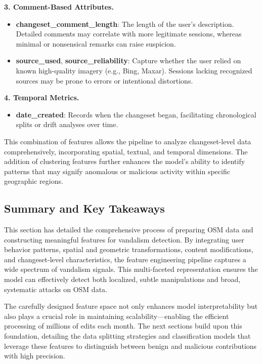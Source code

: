 \documentclass[
    13pt, %
    a4paper, %
    listof=totoc, %
    bibliography=totoc, %
    index=totoc, %
    headsepline
]{scrreprt}
\begin{document}
\vspace{1em}
\noindent
\textbf{3. Comment-Based Attributes.}
\begin{itemize}
  \item \textbf{changeset\_comment\_length}: The length of the user’s description. Detailed comments may correlate with more legitimate sessions, whereas minimal or nonsensical remarks can raise suspicion.
  \item \textbf{source\_used}, \textbf{source\_reliability}: Capture whether the user relied on known high-quality imagery (e.g., Bing, Maxar). Sessions lacking recognized sources may be prone to errors or intentional distortions.
\end{itemize}

\vspace{1em}
\noindent
\textbf{4. Temporal Metrics.}
\begin{itemize}
  \item \textbf{date\_created}: Records when the changeset began, facilitating chronological splits or drift analyses over time.
\end{itemize}

\vspace{1em}
This combination of features allows the pipeline to analyze changeset-level data comprehensively, incorporating spatial, textual, and temporal dimensions. The addition of clustering features further enhances the model’s ability to identify patterns that may signify anomalous or malicious activity within specific geographic regions.

\subsection{Summary and Key Takeaways}

This section has detailed the comprehensive process of preparing OSM data and constructing meaningful features for vandalism detection. By integrating user behavior patterns, spatial and geometric transformations, content modifications, and changeset-level characteristics, the feature engineering pipeline captures a wide spectrum of vandalism signals. This multi-faceted representation ensures the model can effectively detect both localized, subtle manipulations and broad, systematic attacks on OSM data.

The carefully designed feature space not only enhances model interpretability but also plays a crucial role in maintaining scalability—enabling the efficient processing of millions of edits each month. The next sections build upon this foundation, detailing the data splitting strategies and classification models that leverage these features to distinguish between benign and malicious contributions with high precision.
\end{document}
